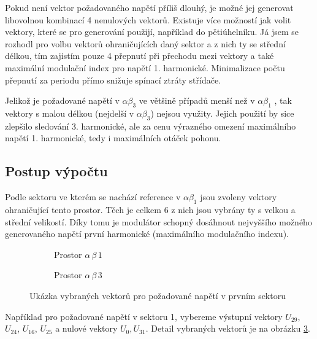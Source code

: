 Pokud není vektor požadovaného napětí příliš dlouhý, je možné jej generovat libovolnou kombinací 4 nenulových vektorů. Existuje více možností jak volit vektory, které se pro generování použijí, například do pětiúhelníku. Já jsem se rozhodl pro volbu vektorů ohraničujících daný sektor a z nich ty se střední délkou, tím zajistím pouze 4 přepnutí při přechodu mezi vektory a také maximální modulační index pro napětí 1. harmonické. Minimalizace počtu přepnutí za periodu přímo snižuje spínací ztráty střídače.\cite{pentagram} \cite{multiphasePMSM} 


Jelikož je požadované napětí v $\alpha \beta_3$ ve většině případů menší než v  $\alpha \beta_1$ , tak vektory s malou délkou (nejdelší v $\alpha \beta_3$) nejsou využity. Jejich použití by sice zlepšilo sledování 3. harmonické, ale za cenu výrazného omezení maximálního napětí 1. harmonické, tedy i maximálních otáček pohonu. 


\subsection{Postup výpočtu}
Podle sektoru ve kterém se nachází reference v  $\alpha \beta_1$  jsou zvoleny vektory ohraničující tento prostor. Těch je celkem 6 z nich jsou vybrány ty s velkou a střední velikostí. Díky tomu je modulátor schopný dosáhnout nejvyššího možného generovaného napětí první harmonické (maximálního modulačního indexu).

\begin{figure}[htbp]
     \centering
     \begin{subfigure}[b]{0.45\textwidth}
         \centering
         
         \caption{Prostor $\alpha \, \beta \,1$ }
         \label{fig:svm detail vlevo}
     \end{subfigure}
     \hfill %
     \begin{subfigure}[b]{0.45\textwidth}
         \centering
         
         \caption{Prostor $\alpha \, \beta \,3$}
         \label{fig:svm detail vpravo}
     \end{subfigure}
     
     \caption{Ukázka vybraných vektorů pro požadované napětí v prvním sektoru}
     \label{fig:svm_detail}
\end{figure}



Například pro požadované napětí v sektoru 1, vybereme výstupní vektory $U_{29}$, $U_{24}$, $U_{16}$, $U_{25}$ a nulové vektory $U_{0},U_{31}$. Detail vybraných vektorů je na obrázku \ref{fig:svm_detail}.

